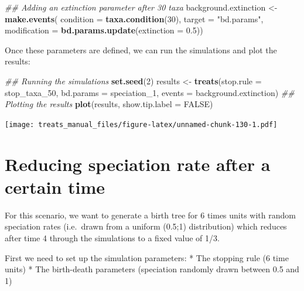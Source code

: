 \documentclass[
]{book}
\newenvironment{Shaded}{\begin{snugshade}}{\end{snugshade}}
\newcommand{\CommentTok}[1]{\textcolor[rgb]{0.56,0.35,0.01}{\textit{#1}}}
\newcommand{\DataTypeTok}[1]{\textcolor[rgb]{0.13,0.29,0.53}{#1}}
\newcommand{\DecValTok}[1]{\textcolor[rgb]{0.00,0.00,0.81}{#1}}
\newcommand{\FloatTok}[1]{\textcolor[rgb]{0.00,0.00,0.81}{#1}}
\newcommand{\KeywordTok}[1]{\textcolor[rgb]{0.13,0.29,0.53}{\textbf{#1}}}
\newcommand{\NormalTok}[1]{#1}
\newcommand{\OtherTok}[1]{\textcolor[rgb]{0.56,0.35,0.01}{#1}}
\newcommand{\StringTok}[1]{\textcolor[rgb]{0.31,0.60,0.02}{#1}}
\begin{document}
\begin{Shaded}
\begin{Highlighting}[]
\CommentTok{\#\# Adding an extinction parameter after 30 taxa}
\NormalTok{background.extinction \textless{}{-}}\StringTok{ }\KeywordTok{make.events}\NormalTok{(}
                      \DataTypeTok{condition =} \KeywordTok{taxa.condition}\NormalTok{(}\DecValTok{30}\NormalTok{),}
                      \DataTypeTok{target =} \StringTok{"bd.params"}\NormalTok{,}
                      \DataTypeTok{modification =} \KeywordTok{bd.params.update}\NormalTok{(}\DataTypeTok{extinction =} \FloatTok{0.5}\NormalTok{))}
\end{Highlighting}
\end{Shaded}

Once these parameters are defined, we can run the simulations and plot the results:

\begin{Shaded}
\begin{Highlighting}[]
\CommentTok{\#\# Running the simulations}
\KeywordTok{set.seed}\NormalTok{(}\DecValTok{2}\NormalTok{)}
\NormalTok{results \textless{}{-}}\StringTok{ }\KeywordTok{treats}\NormalTok{(}\DataTypeTok{stop.rule =}\NormalTok{ stop\_taxa\_}\DecValTok{50}\NormalTok{,}
                \DataTypeTok{bd.params =}\NormalTok{ speciation\_}\DecValTok{1}\NormalTok{,}
                \DataTypeTok{events =}\NormalTok{ background.extinction)}
\CommentTok{\#\# Plotting the results}
\KeywordTok{plot}\NormalTok{(results, }\DataTypeTok{show.tip.label =} \OtherTok{FALSE}\NormalTok{)}
\end{Highlighting}
\end{Shaded}

\texttt{[image: treats\_manual\_files/figure-latex/unnamed-chunk-130-1.pdf]}

\hypertarget{EGred_spec}{%
\section{Reducing speciation rate after a certain time}\label{EGred_spec}}

For this scenario, we want to generate a birth tree for 6 times units with random speciation rates (i.e.~drawn from a uniform (0.5;1) distribution) which reduces after time 4 through the simulations to a fixed value of 1/3.

First we need to set up the simulation parameters:
* The stopping rule (6 time units)
* The birth-death parameters (speciation randomly drawn between 0.5 and 1)
\end{document}
